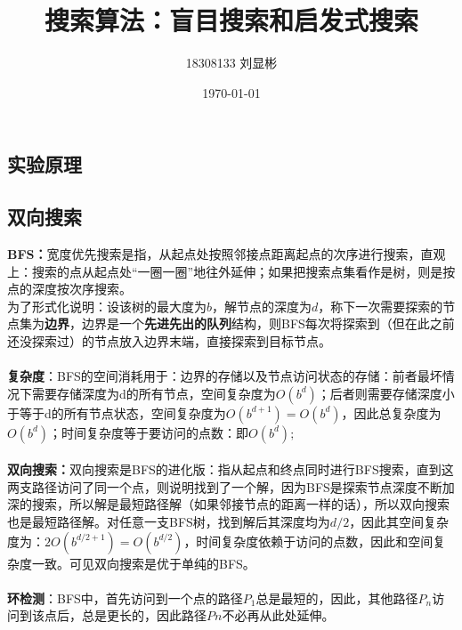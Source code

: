 \documentclass{article}
\title{搜索算法：盲目搜索和启发式搜索}
\author{18308133 刘显彬}
\date{\today}
\begin{document}
\begin{CJK}{UTF8}{gbsn}	
		\maketitle
\section{实验原理}
	\subsection{双向搜索}
	\textbf{BFS：}宽度优先搜索是指，从起点处按照邻接点距离起点的次序进行搜索，直观上：搜索的点从起点处“一圈一圈”地往外延伸；如果把搜索点集看作是树，则是按点的深度按次序搜索。\\为了形式化说明：设该树的最大度为$b$，解节点的深度为$d$，称下一次需要探索的节点集为\textbf{边界}，边界是一个\textbf{先进先出的队列}结构，则BFS每次将探索到（但在此之前还没探索过）的节点放入边界末端，直接探索到目标节点。\\ \\
		\textbf{复杂度}：BFS的空间消耗用于：边界的存储以及节点访问状态的存储：前者最坏情况下需要存储深度为d的所有节点，空间复杂度为$O(b^d)$；后者则需要存储深度小于等于d的所有节点状态，空间复杂度为$O(b^{d+1})=O(b^d)$，因此总复杂度为$O(b^d)$；时间复杂度等于要访问的点数：即$O(b^d);$
		\\ \\
	\textbf{双向搜索：}双向搜索是BFS的进化版：指从起点和终点同时进行BFS搜索，直到这两支路径访问了同一个点，则说明找到了一个解，因为BFS是探索节点深度不断加深的搜索，所以解是最短路径解（如果邻接节点的距离一样的话），所以双向搜索也是最短路径解。对任意一支BFS树，找到解后其深度均为$d/2$，因此其空间复杂度为：$2O(b^{d/2+1})=O(b^{d/2})$，时间复杂度依赖于访问的点数，因此和空间复杂度一致。可见双向搜索是优于单纯的BFS。\\
	\\
	\textbf{环检测}：BFS中，首先访问到一个点的路径$P_1$总是最短的，因此，其他路径$P_n$访问到该点后，总是更长的，因此路径$Pn$不必再从此处延伸。
	

\end{CJK}
\end{document}
